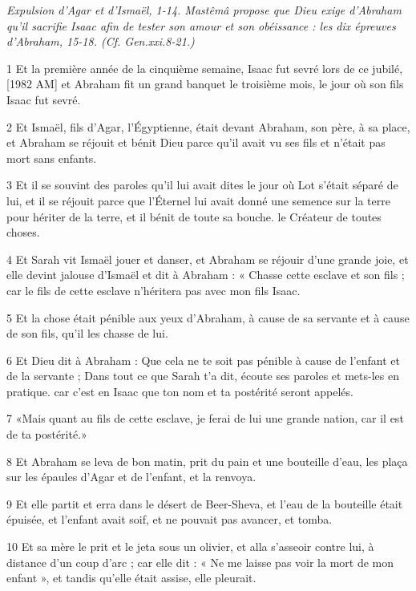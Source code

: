 
\par \textit{Expulsion d'Agar et d'Ismaël, 1-14. Mastêmâ propose que Dieu exige d'Abraham qu'il sacrifie Isaac afin de tester son amour et son obéissance : les dix épreuves d'Abraham, 15-18. (Cf. Gen.xxi.8-21.)}

\par 1 Et la première année de la cinquième semaine, Isaac fut sevré lors de ce jubilé, [1982 AM] et Abraham fit un grand banquet le troisième mois, le jour où son fils Isaac fut sevré.
\par 2 Et Ismaël, fils d'Agar, l'Égyptienne, était devant Abraham, son père, à sa place, et Abraham se réjouit et bénit Dieu parce qu'il avait vu ses fils et n'était pas mort sans enfants.
\par 3 Et il se souvint des paroles qu'il lui avait dites le jour où Lot s'était séparé de lui, et il se réjouit parce que l'Éternel lui avait donné une semence sur la terre pour hériter de la terre, et il bénit de toute sa bouche. le Créateur de toutes choses.
\par 4 Et Sarah vit Ismaël jouer et danser, et Abraham se réjouir d'une grande joie, et elle devint jalouse d'Ismaël et dit à Abraham : « Chasse cette esclave et son fils ; car le fils de cette esclave n'héritera pas avec mon fils Isaac.
\par 5 Et la chose était pénible aux yeux d'Abraham, à cause de sa servante et à cause de son fils, qu'il les chasse de lui.
\par 6 Et Dieu dit à Abraham : Que cela ne te soit pas pénible à cause de l'enfant et de la servante ; Dans tout ce que Sarah t'a dit, écoute ses paroles et mets-les en pratique. car c'est en Isaac que ton nom et ta postérité seront appelés.
\par 7 «Mais quant au fils de cette esclave, je ferai de lui une grande nation, car il est de ta postérité.»
\par 8 Et Abraham se leva de bon matin, prit du pain et une bouteille d'eau, les plaça sur les épaules d'Agar et de l'enfant, et la renvoya.
\par 9 Et elle partit et erra dans le désert de Beer-Sheva, et l'eau de la bouteille était épuisée, et l'enfant avait soif, et ne pouvait pas avancer, et tomba.
\par 10 Et sa mère le prit et le jeta sous un olivier, et alla s'asseoir contre lui, à distance d'un coup d'arc ; car elle dit : « Ne me laisse pas voir la mort de mon enfant », et tandis qu'elle était assise, elle pleurait.
